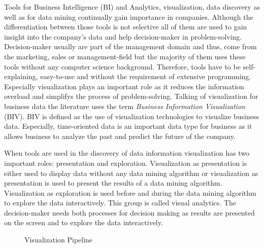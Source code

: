 Tools for Business Intelligence (BI) and Analytics, visualization, data discovery as well as for data mining continually gain importance in companies. Although the differentiation between those tools is not selective all of them are used to gain insight into the company's data and help decision-maker in problem-solving. Decision-maker usually are part of the management domain and thus, come from the marketing, sales or management-field but the majority of them uses these tools without any computer science background. Therefore, tools have to be self-explaining, easy-to-use \cite{Crapo2000} and without the requirement of extensive programming. Especially visualization plays an important role as it reduces the information overload\cite{Keima} and simplifys the process of problem-solving\cite{Zhang}. Talking of visualization for business data the literature uses the term \textit{Business Information Visualization} (BIV). BIV is defined as the use of visualization technologies to visualize business data\cite{Tegarden1999}.  
Especially, time-oriented data is an important data type for business as it allows business to analyze the past and predict the future of the company\cite{Ao2010}.

When tools are used in the discovery of data information visualization has two important roles: presentation and exploration\cite{Crapo2000}. Visualization as presentation is either used to display data without any data mining algorithm or visualization as presentation is used to present the results of a data mining algorithm. Visualization as exploration is used before and during the data mining algorithm to explore the data interactively. This group is called visual analytics. The decision-maker needs both processes for decision making as results are presented on the screen and to explore the data interactively\cite{Ware2012a}. 
\begin{figure}[H]
    \centering
    \caption{Visualization Pipeline \cite{Ware2012a}}
    \label{fig:my_label}
\end{figure}

